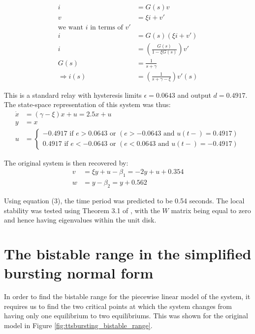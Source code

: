 \documentclass[a4paper, 12pt]{article}
\begin{document}
\begin{appendices}
\begin{align}
i &= G(s)v \\
v &= \xi i + v' \\
\text{we want $i$ in terms of $v'$}\\
i &= G(s)(\xi i + v') \\
i &= \left(\frac{G(s)}{1-\xi G(s)}\right)v'\\
G(s) &= \frac{1}{s + \gamma}\\
\Rightarrow i(s) &= \left(\frac{1}{s+\gamma-\xi}\right)v'(s)
\end{align}

This is a standard relay with hysteresis limits $\epsilon = 0.0643$ and output $d = 0.4917$. The state-space representation of this system was thus:
\begin{align}
\dot{x} &= (\gamma-\xi)x + u = 2.5x + u \\
y &= x \\
u &= \begin{cases}
	               -0.4917 \text{ if } e > 0.0643 \text{ or } (e >-0.0643 \text{ and } u(t-) = 0.4917)\\
	                0.4917 \text{ if } e < -0.0643 \text{ or } (e < 0.0643 \text{ and } u(t-) = -0.4917)	              
	            \end{cases}
\end{align}

The original system is then recovered by:
\begin{align}
v&= \xi y + u - \beta_1 = -2y+u+0.354 \\
w&= y - \beta_2 = y + 0.562 
\end{align}

Using equation (3), the time period was predicted to be 0.54 seconds. The local stability was tested using Theorem 3.1 of \cite{astrom1995}, with the $W$ matrix being equal to zero and hence having eigenvalues within the unit disk. 

\section{The bistable range in the simplified bursting normal form}

In order to find the bistable range for the piecewise linear model of the system, it requires us to find the two critical points at which the system changes from having only one equilibrium to two equilibriums. This was shown for the original model in Figure \ref{fig:ttsbursting_bistable_range}. 


\end{appendices}
\end{document}
